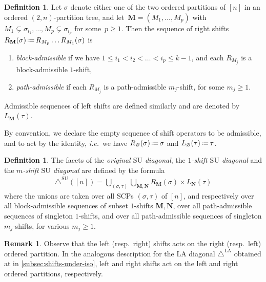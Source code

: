 \documentclass{amsart}
\newcommand{\darkblue}{\color{darkblue}} %
\theoremstyle{definition}
\newtheorem{definition}[theorem]{Definition}
\newtheorem{remark}[theorem]{Remark}
\renewcommand{\b}[1]{{\boldsymbol{#1}}} %
\newcommand{\eqdef}{\mbox{\,\raisebox{0.2ex}{\scriptsize\ensuremath{\mathrm:}}\ensuremath{=}\,}} %
\newcommand{\ie}{\textit{i.e.}~} %
\newcommand{\resp}{resp.~} %
\newcommand{\defn}[1]{\textsl{\darkblue #1}} %
\renewcommand{\b}[1]{\boldsymbol{#1}} %
\newcommand{\SU}{\mathrm{SU}}
\newcommand{\LA}{\mathrm{LA}}
\newcommand{\SUD}{\triangle^{\mathrm{SU}}}
\newcommand{\LAD}{\triangle^{\mathrm{LA}}}
\newcommand{\SCP}{\mathrm{SCP}}
\begin{document}
\begin{definition}
\label{def:SU-admissible}
Let $\sigma$ denote either one of the two ordered partitions of $[n]$ in an ordered \mbox{$(2,n)$-parti}\-tion tree, and let~$\b{M} = (M_1,\dots,M_p)$ with $M_1 \subsetneq \sigma_{i_1}, \dots, M_p \subsetneq \sigma_{i_p}$ for some~$p \ge 1$.
Then the sequence of right shifts~$R_\mathbf{M}(\sigma) \eqdef R_{M_p} \dots R_{M_1}(\sigma)$ is 
\begin{enumerate}
\item \defn{block-admissible} if we have $1\leq i_1 < i_2 < \dots < i_p \leq k-1$, and each $R_{M_j}$ is a block-admissible $1$-shift,
\item \defn{path-admissible} if each $R_{M_j}$ is a path-admissible $m_j$-shift, for some $m_j \geq 1$.
\end{enumerate}
Admissible sequences of left shifts are defined similarly and are denoted by $L_\mathbf{M}(\tau)$.
\end{definition}

By convention, we declare the empty sequence of shift operators to be admissible, and to act by the identity, \ie we have $R_{\mathbf{\varnothing}}(\sigma)  \eqdef  \sigma$ and $L_{\mathbf{\varnothing}} (\tau) \eqdef  \tau$.

\begin{definition}
\label{def:classical-SU}
The facets of the \defn{original $\SU$ diagonal}, the \defn{$1$-shift $\SU$ diagonal} and the \defn{$m$-shift $\SU$ diagonal} are defined by the formula
\begin{align*}
\SUD([n]) = \bigcup_{(\sigma,\tau)} \bigcup_{\mathbf{M}, \mathbf{N}} R_\mathbf{M}(\sigma)\times L_\mathbf{N}(\tau)
\end{align*}
where the unions are taken over all $\SCP$s $(\sigma, \tau)$ of $[n]$, and respectively over all block-admissible sequences of subset $1$-shifts $\b{M},\b{N}$, over all path-admissible sequences of singleton $1$-shifts, and over all path-admissible sequences of singleton $m_j$-shifts, for various $m_j \ge 1$.
\end{definition}

\begin{remark}
Observe that the left (\resp right) shifts acts on the right (\resp left) ordered partition.
In the analogous description for the $\LA$ diagonal $\LAD$ obtained at in \cref{subsec:shifts-under-iso}, left and right shifts act on the left and right ordered partitions, respectively.
\end{remark}
\end{document}

